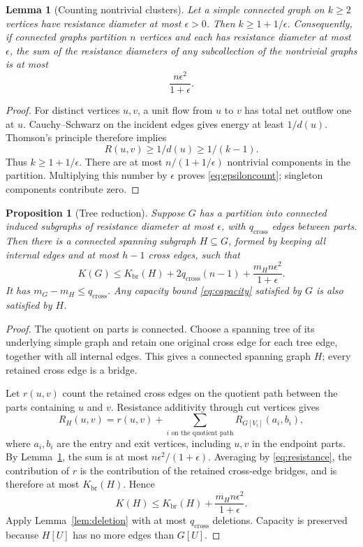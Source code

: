 \documentclass[11pt]{amsart}
\numberwithin{equation}{section}
\newtheorem{proposition}[theorem]{Proposition}
\newtheorem{lemma}[theorem]{Lemma}
\theoremstyle{definition}
\theoremstyle{remark}
\newcommand{\Kbr}{K_{\mathrm{br}}}
\begin{document}
\begin{lemma}[Counting nontrivial clusters]\label{lem:smallres}
Let a simple connected graph on $k\ge2$ vertices have resistance diameter at most $\epsilon>0$. Then $k\ge1+1/\epsilon$. Consequently, if connected graphs partition $n$ vertices and each has resistance diameter at most $\epsilon$, the sum of the resistance diameters of any subcollection of the nontrivial graphs is at most
\begin{equation}\label{eq:epsiloncount}
\frac{n\epsilon^2}{1+\epsilon}.
\end{equation}
\end{lemma}
\begin{proof}
For distinct vertices $u,v$, a unit flow from $u$ to $v$ has total net outflow one at $u$. Cauchy--Schwarz on the incident edges gives energy at least $1/d(u)$. Thomson's principle therefore implies
\[
R(u,v)\ge1/d(u)\ge1/(k-1).
\]
Thus $k\ge1+1/\epsilon$. There are at most $n/(1+1/\epsilon)$ nontrivial components in the partition. Multiplying this number by $\epsilon$ proves \eqref{eq:epsiloncount}; singleton components contribute zero.
\end{proof}

\begin{proposition}[Tree reduction]\label{prop:reduction}
Suppose $G$ has a partition into connected induced subgraphs of resistance diameter at most $\epsilon$, with $q_{\mathrm{cross}}$ edges between parts. Then there is a connected spanning subgraph $H\subseteq G$, formed by keeping all internal edges and at most $h-1$ cross edges, such that
\begin{equation}\label{eq:reduction}
K(G)\le\Kbr(H)+2q_{\mathrm{cross}}(n-1)
+\frac{m_Hn\epsilon^2}{1+\epsilon}.
\end{equation}
It has $m_G-m_H\le q_{\mathrm{cross}}$. Any capacity bound \eqref{eq:capacity} satisfied by $G$ is also satisfied by $H$.
\end{proposition}
\begin{proof}
The quotient on parts is connected. Choose a spanning tree of its underlying simple graph and retain one original cross edge for each tree edge, together with all internal edges. This gives a connected spanning graph $H$; every retained cross edge is a bridge.

Let $r(u,v)$ count the retained cross edges on the quotient path between the parts containing $u$ and $v$. Resistance additivity through cut vertices gives
\[
R_H(u,v)=r(u,v)+\sum_{i\text{ on the quotient path}}R_{G[V_i]}(a_i,b_i),
\]
where $a_i,b_i$ are the entry and exit vertices, including $u,v$ in the endpoint parts. By Lemma~\ref{lem:smallres}, the sum is at most $n\epsilon^2/(1+\epsilon)$. Averaging by \eqref{eq:resistance}, the contribution of $r$ is the contribution of the retained cross-edge bridges, and is therefore at most $\Kbr(H)$. Hence
\[
K(H)\le\Kbr(H)+\frac{m_Hn\epsilon^2}{1+\epsilon}.
\]
Apply Lemma~\ref{lem:deletion} with at most $q_{\mathrm{cross}}$ deletions. Capacity is preserved because $H[U]$ has no more edges than $G[U]$.
\end{proof}
\end{document}
